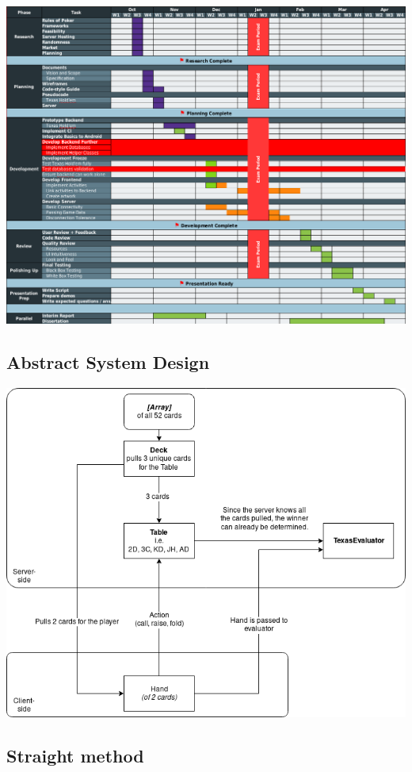 \documentclass[11pt]{article}
\begin{document}
\includegraphics[width=\textwidth]{modified_gantt}


\newpage
\subsection{Abstract System Design}

\includegraphics[width=\textwidth]{wholesystem}


\newpage 

\subsection{Straight method}
\end{document}
